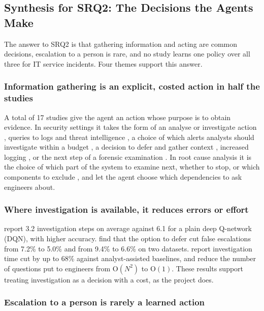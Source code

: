 \documentclass[pdflatex,sn-basic]{sn-jnl}
\begin{document}
\subsection{Synthesis for SRQ2: The Decisions the Agents Make}

The answer to SRQ2 is that gathering information and acting are common decisions, escalation to a person is rare, and no study learns one policy over all three for IT service incidents. Four themes support this answer.

\subsubsection{Information gathering is an explicit, costed action in half the studies}

A total of 17 studies give the agent an action whose purpose is to obtain evidence. In security settings it takes the form of an analyse or investigate action \citep{hammar2026belief,hammar2025,nyberg2024,castro2025,contractor2025,okafor2026}, queries to logs and threat intelligence \citep{sahin2026}, a choice of which alerts analysts should investigate within a budget \citep{tong2020}, a decision to defer and gather context \citep{kovtun2026}, increased logging \citep{jaber2025}, or the next step of a forensic examination \citep{ghanem2026,dunsin2025}. In root cause analysis it is the choice of which part of the system to examine next, whether to stop, or which components to exclude \citep{rojasrodriguez2026,wang2024mrca,wu2026,ding2023}, and \citet{wang2023hrlhf} let the agent choose which dependencies to ask engineers about.

\subsubsection{Where investigation is available, it reduces errors or effort}

\citet{wu2026} report 3.2 investigation steps on average against 6.1 for a plain deep Q-network (DQN), with higher accuracy. \citet{kovtun2026} find that the option to defer cut false escalations from 7.2\% to 5.0\% and from 9.4\% to 6.6\% on two datasets. \citet{ghanem2026} report investigation time cut by up to 68\% against analyst-assisted baselines, and \citet{wang2023hrlhf} reduce the number of questions put to engineers from $\mathrm{O}(N^{2})$ to $\mathrm{O}(1)$. These results support treating investigation as a decision with a cost, as the project does.

\subsubsection{Escalation to a person is rarely a learned action}
\end{document}
